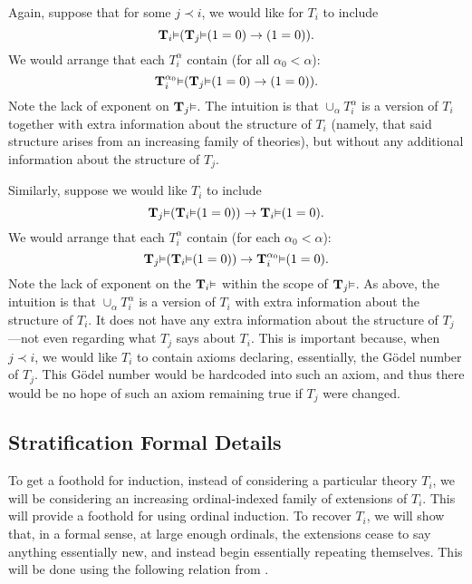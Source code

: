 \documentclass[reqno]{article}
\theoremstyle{definition}
\def\T{\mathbf{T}}
\renewcommand{\Pr}[1]{\T_{#1}\mbox{\small${\vDash}$}}
\newcommand{\Prr}[2]{\T^{#1}_{#2}\mbox{\small${\vDash}$}}
\begin{document}
Again, suppose that for some $j\prec i$, we would like for $T_i$ to include
\[
\Pr i(\Pr j (1=0)\rightarrow (1=0)).
\]
We would arrange
that each $T^\alpha_i$ contain (for all $\alpha_0<\alpha$):
\[
\Prr {\alpha_0} i(\Pr j (1=0)\rightarrow (1=0)).
\]
Note the lack of exponent on $\Pr j$.
The intuition is that $\cup_\alpha T^\alpha_i$ is a
version of $T_i$ together with extra information about the structure of
$T_i$ (namely, that said structure arises from an
increasing family of theories), but without any additional information
about the structure of $T_j$.

Similarly, suppose we would like $T_i$ to include
\[
\Pr j(\Pr i (1=0))\rightarrow \Pr i(1=0).
\]
We would arrange that each $T^\alpha_i$ contain
(for each $\alpha_0<\alpha$):
\[
\Pr j(\Pr i(1=0))\rightarrow \Prr {\alpha_0} i(1=0).
\]
Note the lack of exponent on the $\Pr i$ within the scope of $\Pr j$.
As above, the intuition is that $\cup_\alpha T^\alpha_i$
is a version of $T_i$ with extra information about the structure of
$T_i$. It does not have any extra information about the
structure of $T_j$---not even regarding what $T_j$ says about $T_i$.
This is important because, when $j\prec i$, we would like $T_i$ to
contain axioms declaring, essentially, the G\"odel number of
$T_j$. This G\"odel number would be hardcoded into such an axiom,
and thus there would be no hope of such an axiom remaining true if
$T_j$ were changed.

\subsection{Stratification Formal Details}
\label{StratificationDetailsSection}

To get a foothold for induction, instead of considering a particular theory
$T_i$, we will be considering an increasing ordinal-indexed family of extensions
of $T_i$. This will provide a foothold for using ordinal induction. To recover
$T_i$, we will show that, in a formal sense, at large enough ordinals, the
extensions cease to say anything essentially new, and instead begin essentially
repeating themselves. This will be done using the following relation
from \cite{carlson1999}.
\end{document}
